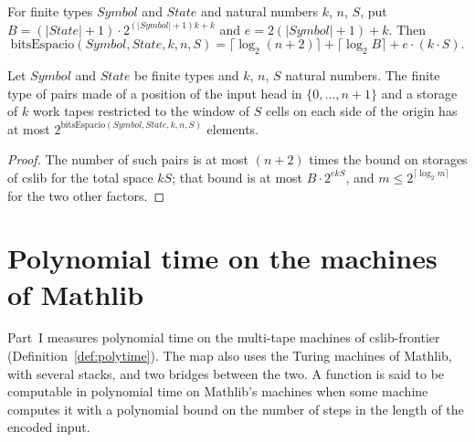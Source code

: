 \begin{definition}
  \label{def:machines-bits-space}
  \leanok
  For finite types $\mathit{Symbol}$ and $\mathit{State}$ and natural numbers $k$, $n$, $S$, put
  $B = (|\mathit{State}| + 1) \cdot 2^{(|\mathit{Symbol}| + 1) k + k}$ and
  $e = 2(|\mathit{Symbol}| + 1) + k$. Then
  \[
    \mathrm{bitsEspacio}(\mathit{Symbol}, \mathit{State}, k, n, S)
    = \lceil \log_2 (n + 2) \rceil + \lceil \log_2 B \rceil + e \cdot (k \cdot S).
  \]
  \own{}
  \infrastructure{}
\end{definition}

\begin{theorem}
  \label{thm:machines-card-bits}
  \leanok
  Let $\mathit{Symbol}$ and $\mathit{State}$ be finite types and $k$, $n$, $S$ natural numbers. The
  finite type of pairs made of a position of the input head in $\{0, \dots, n + 1\}$ and a storage of
  $k$ work tapes restricted to the window of $S$ cells on each side of the origin has at most
  $2^{\mathrm{bitsEspacio}(\mathit{Symbol}, \mathit{State}, k, n, S)}$ elements.
  \own{}
  \infrastructure{}
\end{theorem}

\begin{proof}
  \leanok
  The number of such pairs is at most $(n + 2)$ times the bound on storages of cslib for the total
  space $kS$; that bound is at most $B \cdot 2^{e k S}$, and $m \le 2^{\lceil \log_2 m \rceil}$ for the
  two other factors.
\end{proof}

\section{Polynomial time on the machines of Mathlib}
\label{sec:machines-mathlib}

Part~I measures polynomial time on the multi-tape machines of cslib-frontier
(Definition~\ref{def:polytime}). The map also uses the Turing machines of Mathlib, with several
stacks, and two bridges between the two. A function is said to be computable in polynomial time on
Mathlib's machines when some machine computes it with a polynomial bound on the number of steps in
the length of the encoded input.

